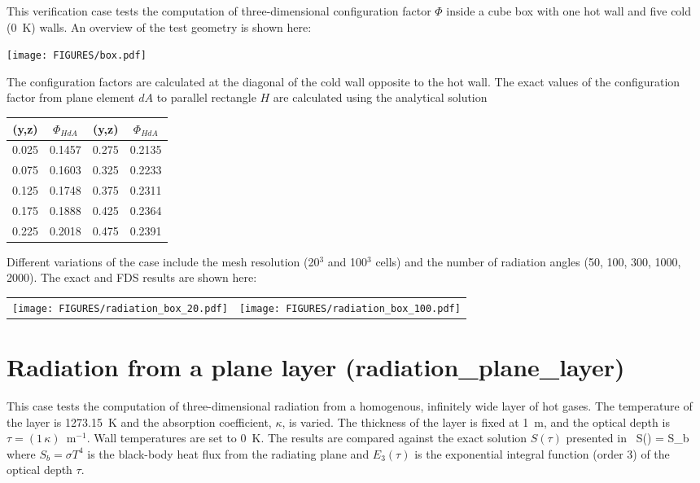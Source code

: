 \documentclass[11pt]{book}
\begin{document}
This verification case tests the computation of three-dimensional configuration factor $\Phi$ inside a cube box with one hot wall and five cold (0~K)
walls. An overview of the test geometry is shown here:
\begin{center}
\texttt{[image: FIGURES/box.pdf]}
\end{center}
The configuration factors are calculated at the diagonal of the cold wall opposite to the hot wall. The exact values of the configuration factor from
plane element $dA$ to parallel rectangle $H$ are calculated using the analytical solution~\cite{Siegel:1}

\begin{center}
\begin{tabular}{|c|c|c|c|}
\hline (y,z) & $\Phi_{HdA}$ & (y,z) & $\Phi_{HdA}$ \\ \hline \hline
0.025   &0.1457 & 0.275 &0.2135 \\
0.075   &0.1603 & 0.325 &0.2233 \\
0.125   &0.1748 & 0.375 &0.2311 \\
0.175   &0.1888 & 0.425 &0.2364 \\
0.225   &0.2018 & 0.475 &0.2391 \\ \hline
\end{tabular}
\end{center}

\noindent Different variations of the case include the mesh resolution (20$^3$ and 100$^3$ cells) and the number of radiation angles (50, 100, 300,
1000, 2000). The exact and FDS results are shown here:

\noindent
\begin{tabular*}{\textwidth}{lr}
\texttt{[image: FIGURES/radiation\_box\_20.pdf]} &
\texttt{[image: FIGURES/radiation\_box\_100.pdf]}
\end{tabular*}





\clearpage

\section{Radiation from a plane layer (\texorpdfstring{{\bf radiation\_plane\_layer}}{radiation\_plane\_layer})}
\label{radiation_plane_layer}

This case tests the computation of three-dimensional radiation from a homogenous, infinitely wide layer of hot gases.  The temperature of
the layer is 1273.15~K and the absorption coefficient, $\kappa$, is varied. The thickness of the layer is fixed at 1~m, and the optical depth is $\tau = (1 \, \kappa)$~m$^{-1}$.
Wall temperatures are set to 0~K. The results are compared against the exact solution $S(\tau)$ presented in~\cite{Zeldovich:1}
\be S(\tau) = S_b \ee
where $S_b = \sigma T^4$ is the black-body heat flux from the radiating plane and $E_3(\tau)$ is the exponential
integral function (order 3) of the optical depth $\tau$.
\end{document}

